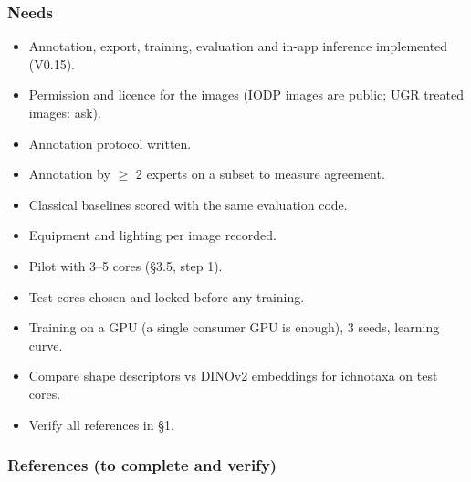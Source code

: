\documentclass[
  10pt,
]{article}
\providecommand{\tightlist}{%
  \setlength{\itemsep}{0pt}\setlength{\parskip}{0pt}}
\begin{document}
\hypertarget{needs}{%
\subsubsection{Needs}\label{needs}}

\begin{itemize}
\tightlist
\item[$\boxtimes$]
  Annotation, export, training, evaluation and in-app inference
  implemented (V0.15).
\item[$\square$]
  Permission and licence for the images (IODP images are public; UGR
  treated images: ask).
\item[$\square$]
  Annotation protocol written.
\item[$\square$]
  Annotation by $\geq$ 2 experts on a subset to measure agreement.
\item[$\square$]
  Classical baselines scored with the same evaluation code.
\item[$\square$]
  Equipment and lighting per image recorded.
\item[$\square$]
  Pilot with 3--5 cores (§3.5, step 1).
\item[$\square$]
  Test cores chosen and locked before any training.
\item[$\square$]
  Training on a GPU (a single consumer GPU is enough), 3 seeds, learning
  curve.
\item[$\square$]
  Compare shape descriptors vs DINOv2 embeddings for ichnotaxa on test
  cores.
\item[$\square$]
  Verify all references in §1.
\end{itemize}

\hypertarget{references-to-complete-and-verify}{%
\subsubsection{References (to complete and
verify)}\label{references-to-complete-and-verify}}
\end{document}

